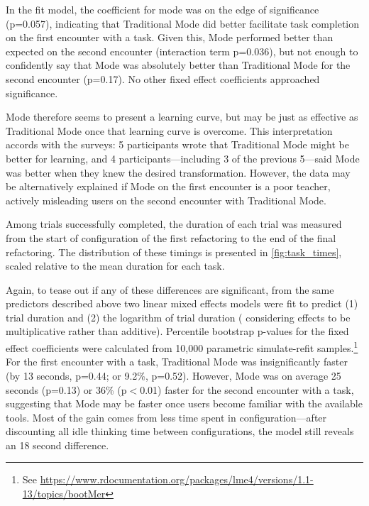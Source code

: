 In the fit model, the coefficient for mode was on the edge of significance (p=0.057), indicating
that Traditional Mode did better facilitate task completion on the first encounter with a task.
Given this, \deuce{} Mode performed better than expected on the second encounter (interaction term
p=0.036), but not enough to confidently say that \deuce{} Mode was absolutely better than
Traditional Mode for the second encounter (p=0.17). No other fixed effect coefficients approached significance.

\deuce{} Mode therefore seems to present a learning curve, but may be just as effective as
Traditional Mode once that learning curve is overcome. This interpretation accords with the surveys:
5 participants wrote that Traditional Mode might be better for learning, and
4 participants---including 3 of the previous 5---said \deuce{} Mode was
better when they knew the desired transformation.
However, the data may be
alternatively explained if \deuce{} Mode on the first encounter is a poor teacher, actively
misleading users on the second encounter with Traditional Mode.









 Among trials successfully
completed, the duration of each trial was measured from the start of configuration of the first refactoring
to the end of the final refactoring. The distribution of these timings is presented
in \autoref{fig:task_times}, scaled relative to the mean duration for each task.

Again, to tease out if any of these differences are significant, from the same predictors described above
two linear mixed effects models were fit to predict (1) trial duration and (2) the logarithm of trial duration
(\ie{} considering effects to be multiplicative rather than additive).
Percentile bootstrap p-values
for the fixed effect coefficients were calculated
from 10,000 parametric simulate-refit samples.\footnote{See \url{https://www.rdocumentation.org/packages/lme4/versions/1.1-13/topics/bootMer}}
For the first encounter
with a task, Traditional Mode was insignificantly faster (by 13 seconds, p=0.44; or 9.2\%, p=0.52).
However, \deuce{} Mode was
on average 25 seconds (p=0.13) or 36\% (p$<$0.01) faster for the second encounter with a task, suggesting that
\deuce{} Mode may be faster once users become familiar with the available tools. Most of the gain
comes from less time spent in configuration---after discounting all idle thinking time between
configurations, the model still reveals an 18 second difference.

